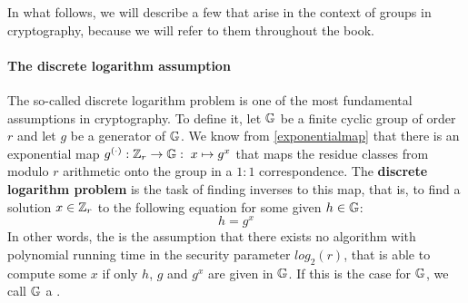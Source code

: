 In what follows, we will describe a few  that arise in the context of groups in cryptography, because we will refer to them throughout the book.
\paragraph{The discrete logarithm assumption} The so-called discrete logarithm problem is one of the most fundamental assumptions in cryptography. To define it, let $\mathbb{G}$ be a finite cyclic group of order $r$ and let $g$ be a generator of $\mathbb{G}$.  We know from \ref{exponentialmap} that there is an exponential map
$g^{(\cdot)}: \mathbb{Z}_r \to \mathbb{G}:\; x\mapsto g^x$ that maps the residue classes from modulo $r$ arithmetic onto the group in a $1:1$ correspondence. The \textbf{discrete logarithm problem} is the task of finding inverses to this map, that is, to find a solution $x\in\mathbb{Z}_r$ to the following equation for some given $h\in\mathbb{G}$:
\begin{equation}
h = g^x
\end{equation}
In other words, the  is the assumption that there exists no algorithm with polynomial running time  in the security parameter $log_2(r)$, that is able to compute some $x$ if only $h$, $g$ and $g^x$ are given in $\mathbb{G}$. If this is the case for $\mathbb{G}$, we call $\mathbb{G}$ a .

